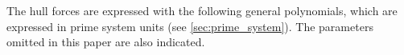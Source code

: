 The hull forces are expressed with the following general polynomials, which are expressed in prime system units (see \autoref{sec:prime_system}). The parameters  omitted in this paper are also indicated. 
\begin{equation}
    \label{eq:X_H}
    
\end{equation}
%
\begin{equation}
    \label{eq:Y_H}
    
\end{equation}
%
\begin{equation}
    \label{eq:N_H}
    
\end{equation}